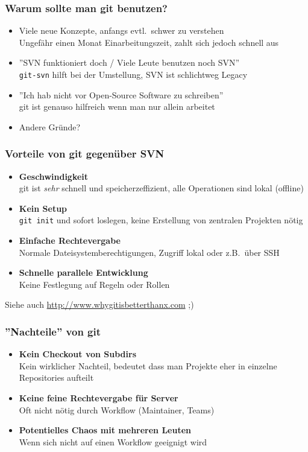 \begin{frame}
  \frametitle{Warum sollte man git benutzen?}
  \begin{itemize}
    \pause
    \item Viele neue Konzepte, anfangs evtl.\ schwer zu verstehen \\ Ungefähr einen Monat Einarbeitungszeit, zahlt sich jedoch schnell aus
    \pause
    \item ''SVN funktioniert doch / Viele Leute benutzen noch SVN'' \\ {\tt git-svn} hilft bei der Umstellung, SVN ist schlichtweg Legacy
    \pause
    \item ''Ich hab nicht vor Open-Source Software zu schreiben'' \\ git ist genauso hilfreich wenn man nur allein arbeitet
    \pause
    \item Andere Gründe?
  \end{itemize}
\end{frame}

\begin{frame}
  \frametitle{Vorteile von git gegenüber SVN}
  \begin{itemize}
    \pause
    \item {\bf Geschwindigkeit} \\ git ist \emph{sehr} schnell und speicherzeffizient, alle Operationen sind lokal (offline)
    \pause
    \item {\bf Kein Setup} \\ {\tt git init} und sofort loslegen, keine Erstellung von zentralen Projekten nötig
    \pause
    \item {\bf Einfache Rechtevergabe} \\ Normale Dateisystemberechtigungen, Zugriff lokal oder z.B.\ über SSH
    \pause
    \item {\bf Schnelle parallele Entwicklung} \\ Keine Festlegung auf Regeln oder Rollen
  \end{itemize}
  Siehe auch \url{http://www.whygitisbetterthanx.com} ;)
\end{frame}

\begin{frame}
  \frametitle{''Nachteile'' von git}
  \begin{itemize}
    \pause
    \item {\bf Kein Checkout von Subdirs} \\ Kein wirklicher Nachteil, bedeutet dass man Projekte eher in einzelne Repositories aufteilt
    \pause
    \item {\bf Keine feine Rechtevergabe für Server} \\ Oft nicht nötig durch Workflow (Maintainer, Teams)
    \pause
    \item {\bf Potentielles Chaos mit mehreren Leuten} \\ Wenn sich nicht auf einen Workflow geeignigt wird
  \end{itemize}
\end{frame}

